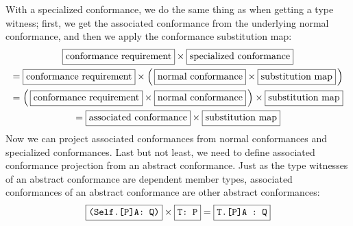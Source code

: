 \documentclass[a4paper,headsepline,bibliography=totoc,toc=flat,fleqn,twoside=semi]{scrbook}
\theoremstyle{definition}
\theoremstyle{definition}
\theoremstyle{definition}
\newcommand{\mathboxed}[1]{\boxed{\mbox{\vphantom{pI\texttt{pI}}#1}}}
\newcommand{\ttbox}[1]{\boxed{\mbox{\vphantom{pI\texttt{pI}}\texttt{#1}}}}
\begin{document}
With a specialized conformance, we do the same thing as when getting a type witness; first, we get the associated conformance from the underlying normal conformance, and then we apply the conformance substitution map:
\begin{gather*}
\mathboxed{conformance requirement} \times \mathboxed{specialized conformance}\\
= \mathboxed{conformance requirement} \times \left(\, \mathboxed{normal conformance} \times \mathboxed{substitution map} \,\right)\\
= \left(\,\mathboxed{conformance requirement} \times \mathboxed{normal conformance}\,\right) \times \mathboxed{substitution map}\\
= \mathboxed{associated conformance} \times \mathboxed{substitution map}
\end{gather*}
Now we can project associated conformances from normal conformances and specialized conformances. Last but not least, we need to define associated conformance projection from an abstract conformance. Just as the type witnesses of an abstract conformance are dependent member types, associated conformances of an abstract conformance are other abstract conformances:
\[
\ttbox{(Self.[P]A:\ Q)} \times \ttbox{T:\ P} = \ttbox{T.[P]A : Q}
\]
\end{document}
